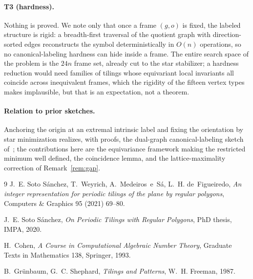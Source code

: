 \documentclass[11pt]{article}
\theoremstyle{definition}
\begin{document}
\paragraph{T3 (hardness).} Nothing is proved. We note only that once a frame $(g,o)$ is
fixed, the labeled structure is rigid: a breadth-first traversal of the quotient graph with
direction-sorted edges reconstructs the symbol deterministically in $O(n)$ operations, so
no canonical-labeling hardness can hide inside a frame. The entire search space of the
problem is the $24n$ frame set, already cut to the star stabilizer; a hardness reduction
would need families of tilings whose equivariant local invariants all coincide across
inequivalent frames, which the rigidity of the fifteen vertex types makes implausible, but
that is an expectation, not a theorem.

\paragraph{Relation to prior sketches.} Anchoring the origin at an extremal intrinsic label
and fixing the orientation by star minimization realizes, with proofs, the dual-graph
canonical-labeling sketch of~\cite[\S5.10]{soto2020thesis}; the contributions here are the
equivariance framework making the restricted minimum well defined, the coincidence lemma,
and the lattice-maximality correction of Remark~\ref{rem:gap}.

\begin{thebibliography}{9}
J.~E. Soto S\'anchez, T.~Weyrich, A.~Medeiros~e~S\'a, L.~H. de~Figueiredo,
\emph{An integer representation for periodic tilings of the plane by regular polygons},
Computers \& Graphics 95 (2021) 69--80.

J.~E. Soto S\'anchez,
\emph{On Periodic Tilings with Regular Polygons},
PhD thesis, IMPA, 2020.

H.~Cohen,
\emph{A Course in Computational Algebraic Number Theory},
Graduate Texts in Mathematics 138, Springer, 1993.

B.~Gr\"unbaum, G.~C. Shephard,
\emph{Tilings and Patterns},
W.~H. Freeman, 1987.
\end{thebibliography}
\end{document}
